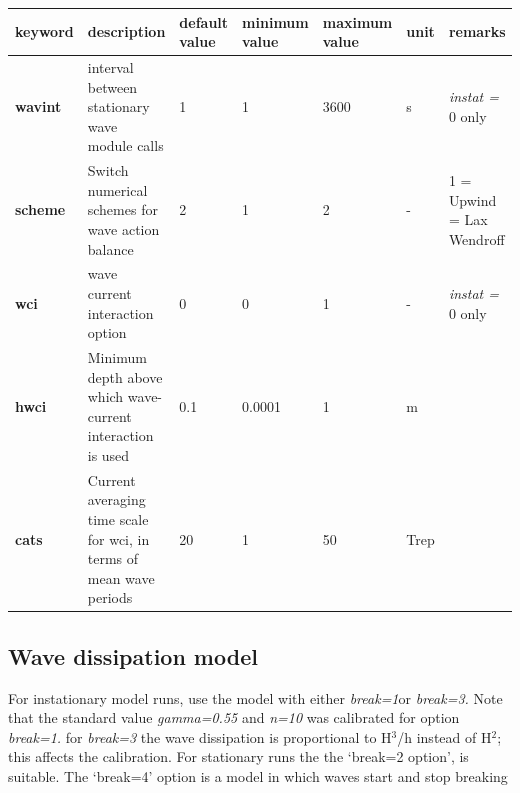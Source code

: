 \begin{tabular}{|p{0.5in}|p{1.1in}|p{0.4in}|p{0.5in}|p{0.5in}|p{0.3in}|p{0.7in}|} \hline 
keyword & description & default value & minimum value & maximum value & unit & remarks \\ \hline 
\textbf{wavint    } & interval between stationary wave module calls & 1 & 1 & 3600 & s & \textit{instat =} 0 only \\ \hline 
\textbf{scheme} & Switch numerical schemes for wave action balance & 2 & 1 & 2 & - & 1 = Upwind\newline 2 = Lax Wendroff \\ \hline 
\textbf{wci       } & wave current interaction option & 0 & 0 & 1 & - & \textit{instat =} 0 only \\ \hline 
\textbf{hwci} & Minimum depth above which wave-current interaction is used & 0.1 & 0.0001 & 1 & m & \textit{} \\ \hline 
\textbf{cats} & Current averaging time scale for wci, in terms of mean wave periods & 20 & 1 & 50 & Trep & \textit{} \\ \hline 
\end{tabular}
\subsection{ Wave dissipation model}

For instationary model runs, use the \citet{Roelvink1993a} model with either \textit{break=1}or\textit{ break=3.} Note that the standard value \textit{gamma=0.55 }and \textit{n=10} was calibrated for option \textit{break=1.} for \textit{break=3} the wave dissipation is proportional to H${}^{3}$/h instead of H${}^{2}$; this affects the calibration. For stationary runs the \citet{Baldock1998} the `break=2 option', is suitable. The `break=4' option is a model in which waves start and stop breaking 

